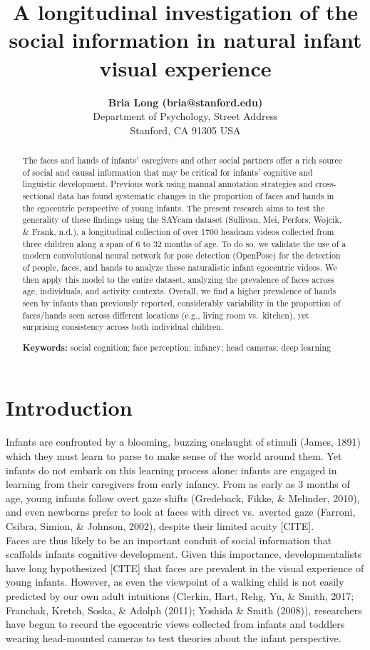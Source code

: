 \documentclass[10pt, letterpaper]{article}
\title{A longitudinal investigation of the social information in natural infant
visual experience}
\author{{\large \bf Bria Long (bria@stanford.edu)}  \AND {\large \bf George Kachergis (kachergis@stanford.edu)}  \AND {\large \bf Ketan Jay Agarwal (agrawalk@stanford.edu)}  \AND {\large \bf Michael C. Frank (mcfrank@stanford.edu)} \\  Department of Psychology, Street Address \\ Stanford, CA 91305 USA}
\begin{document}
\maketitle

\begin{abstract}
The faces and hands of infants' caregivers and other social partners
offer a rich source of social and causal information that may be
critical for infants' cognitive and linguistic development. Previous
work using manual annotation strategies and cross-sectional data has
found systematic changes in the proportion of faces and hands in the
egocentric perspective of young infants. The present research aims to
test the generality of these findings using the SAYcam dataset
(Sullivan, Mei, Perfors, Wojcik, \& Frank, n.d.), a longitudinal
collection of over 1700 headcam videos collected from three children
along a span of 6 to 32 months of age. To do so, we validate the use of
a modern convolutional neural network for pose detection (OpenPose) for
the detection of people, faces, and hands to analyze these naturalistic
infant egocentric videos. We then apply this model to the entire
dataset, analyzing the prevalence of faces across age, individuals, and
activity contexts. Overall, we find a higher prevalence of hands seen by
infants than previously reported, considerably variability in the
proportion of faces/hands seen across different locations (e.g., living
room vs.~kitchen), yet surprising consistency across both individual
children.

\textbf{Keywords:}
social cognition; face perception; infancy; head cameras; deep learning
\end{abstract}

\hypertarget{introduction}{%
\section{Introduction}\label{introduction}}

Infants are confronted by a blooming, buzzing onslaught of stimuli
(James, 1891) which they must learn to parse to make sense of the world
around them. Yet infants do not embark on this learning process alone:
infants are engaged in learning from their caregivers from early
infancy. From as early as 3 months of age, young infants follow overt
gaze shifts (Gredeback, Fikke, \& Melinder, 2010), and even newborns
prefer to look at faces with direct vs.~averted gaze (Farroni, Csibra,
Simion, \& Johnson, 2002), despite their limited acuity {[}CITE{]}.\\
Faces are thus likely to be an important conduit of social information
that scaffolds infants cognitive development. Given this importance,
developmentalists have long hypothesized {[}CITE{]} that faces are
prevalent in the visual experience of young infants. However, as even
the viewpoint of a walking child is not easily predicted by our own
adult intuitions (Clerkin, Hart, Rehg, Yu, \& Smith, 2017; Franchak,
Kretch, Soska, \& Adolph (2011); Yoshida \& Smith (2008)), researchers
have begun to record the egocentric views collected from infants and
toddlers wearing head-mounted cameras to test theories about the infant
perspective.
\end{document}
